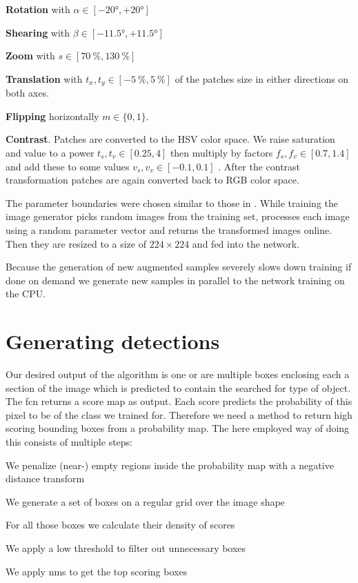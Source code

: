 \begin{my_list_item}
    \item \textbf{Rotation} with $\alpha\in[-\ang{20}, +\ang{20}]$
    \item \textbf{Shearing} with $\beta\in[-\ang{11.5}, + \ang{11.5}]$
    \item \textbf{Zoom} with $s\in[\SI{70}{\percent}, \SI{130}{\percent}]$
    \item \textbf{Translation} with $t_x,t_y\in[-\SI{5}{\percent}, \SI{5}{\percent}]$ of the patches size in either directions on both axes.
    \item \textbf{Flipping} horizontally $m\in\{0,1\}$.
    \item \textbf{Contrast}. Patches are converted to the HSV color space. We raise saturation and value to a power $t_s, t_v \in [0.25, 4]$ then multiply by factors $f_s, f_v \in [0.7, 1.4]$ and add these to some values $v_s, v_v \in [-0.1, 0.1]$ \citep{dosovitskiy_discriminative_2014}. After the contrast transformation patches are again converted back to RGB color space.
\end{my_list_item}
The parameter boundaries were chosen similar to those in \citet{dosovitskiy_discriminative_2014}. While training the image generator picks random images from the training set, processes each image using a random parameter vector and returns the transformed images online. Then they are resized to a size of $224\times 224$ and fed into the network. 

Because the generation of new augmented samples severely slows down training if done on demand we generate new samples in parallel to the network training on the CPU.


\section{Generating detections}
\label{sec:pipeline:eval}
Our desired output of the algorithm is one or are multiple boxes enclosing each a section of the image which is predicted to contain the searched for type of object. The \gls{fcn} returns a score map as output. Each score predicts the probability of this pixel to be of the class we trained for. Therefore we need a method to return high scoring bounding boxes from a probability map. The here employed way of doing this consists of multiple steps:\\
\begin{my_list_num}
    \item We penalize (near-) empty regions inside the probability map with a negative distance transform
    \item We generate a set of boxes on a regular grid over the image shape
    \item For all those boxes we calculate their density of scores
    \item We apply a low threshold to filter out unnecessary boxes
    \item We apply \gls{nms} to get the top scoring boxes
\end{my_list_num}

